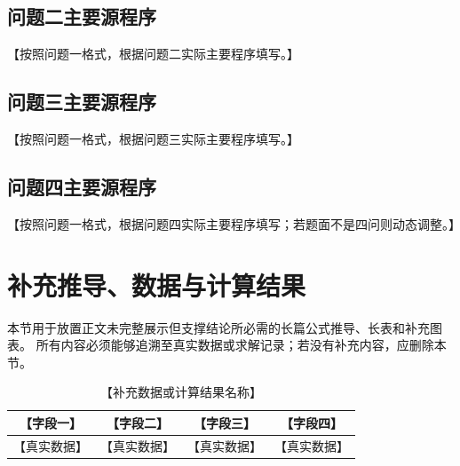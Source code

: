 \subsection{问题二主要源程序}

\noindent 【按照问题一格式，根据问题二实际主要程序填写。】

\subsection{问题三主要源程序}

\noindent 【按照问题一格式，根据问题三实际主要程序填写。】

\subsection{问题四主要源程序}

\noindent 【按照问题一格式，根据问题四实际主要程序填写；若题面不是四问则动态调整。】

\clearpage
\section{补充推导、数据与计算结果}

本节用于放置正文未完整展示但支撑结论所必需的长篇公式推导、长表和补充图表。
所有内容必须能够追溯至真实数据或求解记录；若没有补充内容，应删除本节。

\begin{table}[htbp]
  \centering
  \caption{【补充数据或计算结果名称】}
  \begin{tabular}{cccc}
    \toprule
    \textbf{【字段一】} & \textbf{【字段二】} & \textbf{【字段三】} & \textbf{【字段四】} \\
    \midrule
    【真实数据】 & 【真实数据】 & 【真实数据】 & 【真实数据】 \\
    \bottomrule
  \end{tabular}
  \label{tab:supplementary-results}
\end{table}
